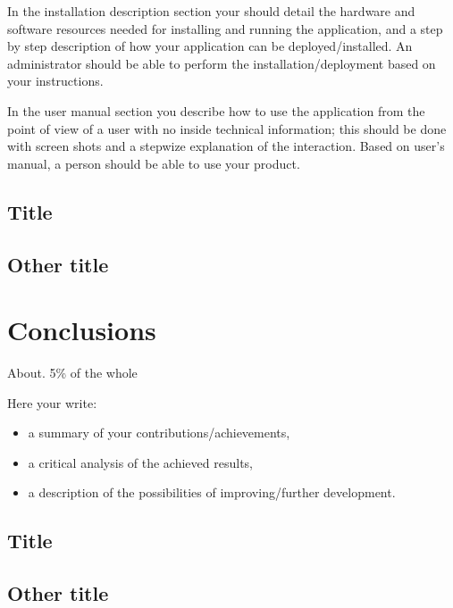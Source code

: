\documentclass[12pt,a4paper,twoside]{report}
\begin{document}
In the installation description section your should detail the hardware and software resources needed for installing and running the application, and a step by step description of how your application can be deployed/installed. An administrator should be able to perform the installation/deployment based on your instructions.

In the user manual section you describe how to use the application from the point of view of a user with no inside technical information; this should be done with screen shots and a stepwize explanation of the interaction. Based on user's manual, a person should be able to use your product.

\section{Title}
\section{Other title}

\chapter{Conclusions}

About. 5\% of the whole

Here your write:
\begin{itemize}
\item a summary of your contributions/achievements,
\item a critical analysis of the achieved results,
\item a description of the possibilities of improving/further development.
\end{itemize}
\section{Title}
\section{Other title}


 


\end{document}
